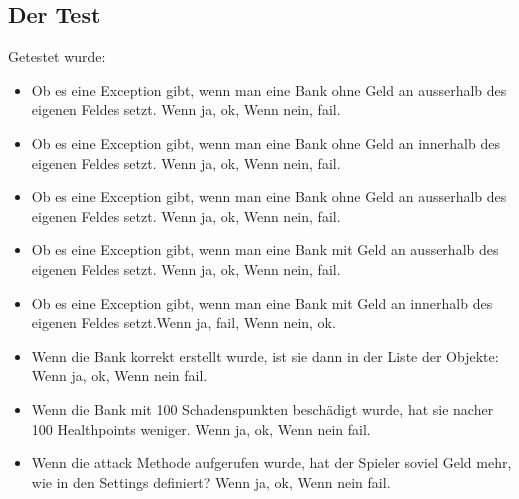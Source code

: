 \documentclass[ngerman, 12pt, pdftex]{scrartcl}[2006/07/30]
\begin{document}
\subsection{Der Test}
Getestet wurde:
\begin{itemize}
\item Ob es eine Exception gibt, wenn man eine Bank ohne Geld an ausserhalb des eigenen Feldes setzt. Wenn ja, ok, Wenn nein, fail.
\item Ob es eine Exception gibt, wenn man eine Bank ohne Geld an innerhalb des eigenen Feldes setzt. Wenn ja, ok, Wenn nein, fail.
\item Ob es eine Exception gibt, wenn man eine Bank ohne Geld an ausserhalb des eigenen Feldes setzt. Wenn ja, ok, Wenn nein, fail.
\item Ob es eine Exception gibt, wenn man eine Bank mit Geld an ausserhalb des eigenen Feldes setzt. Wenn ja, ok, Wenn nein, fail.
\item Ob es eine Exception gibt, wenn man eine Bank mit Geld an innerhalb des eigenen Feldes setzt.Wenn ja, fail, Wenn nein, ok.
\item Wenn die Bank korrekt erstellt wurde, ist sie dann in der Liste der Objekte: Wenn ja, ok, Wenn nein fail.
\item Wenn die Bank mit 100 Schadenspunkten besch\"{a}digt wurde, hat sie nacher 100 Healthpoints weniger. Wenn ja, ok, Wenn nein fail.
\item Wenn die attack Methode aufgerufen wurde, hat der Spieler soviel Geld mehr, wie in den Settings definiert? Wenn ja, ok, Wenn nein fail.
\end{itemize}

 
\end{document}
